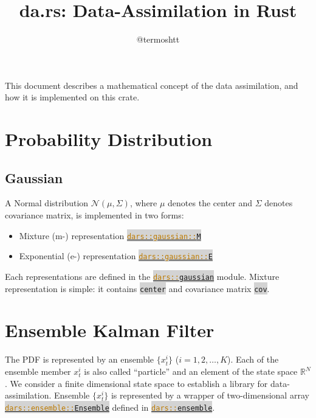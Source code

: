 \documentclass{article}
\newcommand{\rust}[1]{\colorbox{lightgray}{\lstinline[language=Rust]$#1$}}
\newcommand{\docref}[2]{\href{https://docs.rs/dars/*/dars/#2}{\rust{#1}}}
\newcommand{\modref}[1]{\docref{dars::#1}{#1/index.html}}
\newcommand{\structref}[2]{\docref{dars::#1::#2}{#1/struct.#2.html}}
\newcommand{\Normal}{\mathcal{N}}
\newcommand{\Real}{\mathbb{R}}
\begin{document}
\title{da.rs: Data-Assimilation in Rust}
\author{@termoshtt}
\maketitle

This document describes a mathematical concept of the data assimilation,
and how it is implemented on this crate.

\section{Probability Distribution}
\subsection{Gaussian}
A Normal distribution $\Normal(\mu, \Sigma)$, where $\mu$ denotes the center and $\Sigma$ denotes covariance matrix,
is implemented in two forms:
\begin{itemize}
  \item Mixture (m-) representation \structref{gaussian}{M}
  \item Exponential (e-) representation \structref{gaussian}{E}
\end{itemize}
Each representations are defined in the \modref{gaussian} module.
Mixture representation is simple: it contains \rust{center} and covariance matrix \rust{cov}.

\section{Ensemble Kalman Filter}
The PDF is represented by an ensemble $\{ x_t^i \}$ ($i=1,2,\ldots, K$).
Each of the ensemble member $x_t^i$ is also called ``particle'' and an element of the state space $\Real^N$.
We consider a finite dimensional state space to establish a library for data-assimilation.
Ensemble $\{ x_t^i \}$ is represented by a wrapper of two-dimensional array \structref{ensemble}{Ensemble} defined in \modref{ensemble}.
\end{document}
